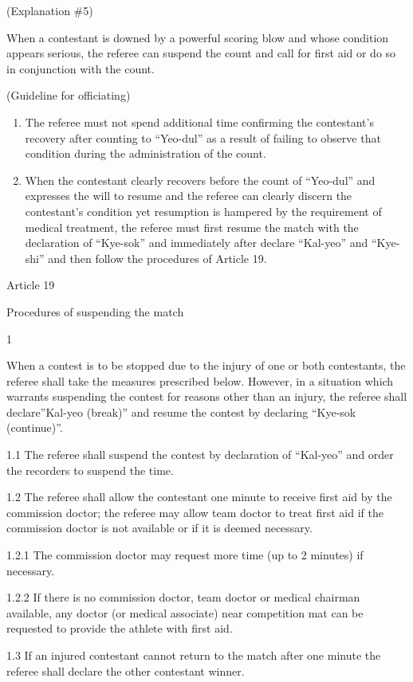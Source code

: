 \documentclass[
]{report}
\renewcommand{\labelenumi}{\arabic{enumi}}
\begin{document}
(Explanation \#5)

When a contestant is downed by a powerful scoring blow and whose
condition appears serious, the referee can suspend the count and call
for first aid or do so in conjunction with the count.

(Guideline for officiating)

\begin{enumerate}
\def\labelenumi{\roman{enumi}.}
\item
  The referee must not spend additional time confirming the contestant's
  recovery after counting to ``Yeo-dul'' as a result of failing to
  observe that condition during the administration of the count.
\item
  When the contestant clearly recovers before the count of ``Yeo-dul''
  and expresses the will to resume and the referee can clearly discern
  the contestant's condition yet resumption is hampered by the
  requirement of medical treatment, the referee must first resume the
  match with the declaration of ``Kye-sok'' and immediately after
  declare ``Kal-yeo'' and ``Kye-shi'' and then follow the procedures of
  Article 19.
\end{enumerate}

Article 19

Procedures of suspending the match

1

When a contest is to be stopped due to the injury of one or both
contestants, the referee shall take the measures prescribed below.
However, in a situation which warrants suspending the contest for
reasons other than an injury, the referee shall declare''Kal-yeo
(break)'' and resume the contest by declaring ``Kye-sok (continue)''.

1.1 The referee shall suspend the contest by declaration of ``Kal-yeo''
and order the recorders to suspend the time.

1.2 The referee shall allow the contestant one minute to receive first
aid by the commission doctor; the referee may allow team doctor to treat
first aid if the commission doctor is not available or if it is deemed
necessary.

1.2.1 The commission doctor may request more time (up to 2 minutes) if
necessary.

1.2.2 If there is no commission doctor, team doctor or medical chairman
available, any doctor (or medical associate) near competition mat can be
requested to provide the athlete with first aid.

1.3 If an injured contestant cannot return to the match after one minute
the referee shall declare the other contestant winner.
\end{document}
